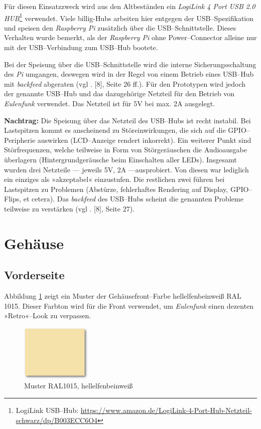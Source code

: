 \documentclass[11pt,ngerman,toc=listof,index=totoc]{scrreprt}
\begin{document}
Für diesen Einsatzzweck wird aus den Altbeständen ein \emph{LogiLink 4
Port USB 2.0 HUB}\footnote{LogiLink USB--Hub:
  \url{https://www.amazon.de/LogiLink-4-Port-Hub-Netzteil-schwarz/dp/B003ECC6O4}}
verwendet. Viele billig-Hubs arbeiten hier entgegen der
USB--Spezifikation und speisen den \emph{Raspberry Pi} zusätzlich über
die USB--Schnittstelle. Dieses Verhalten wurde bemerkt, als der
\emph{Raspberry Pi} ohne Power--Connector alleine nur mit der
USB--Verbindung zum USB--Hub bootete.

Bei der Speisung über die USB--Schnittstelle wird die interne
Sicherungsschaltung des \emph{Pi} umgangen, deswegen wird in der Regel
von einem Betrieb eines USB--Hub mit \emph{backfeed} abgeraten (vgl .
{[}8{]}, Seite 26 ff.). Für den Prototypen wird jedoch der genannte
USB--Hub und das dazugehörige Netzteil für den Betrieb von
\emph{Eulenfunk} verwendet. Das Netzteil ist für 5V bei max. 2A
ausgelegt.

\textbf{Nachtrag:} Die Speisung über das Netzteil des USB--Hubs ist
recht instabil. Bei Lastspitzen kommt es anscheinend zu
Störeinwirkungen, die sich auf die GPIO--Peripherie auswirken
(LCD--Anzeige rendert inkorrekt). Ein weiterer Punkt sind
Störfrequenzen, welche teilweise in Form von Störgeräuschen die
Audioausgabe überlagern (Hintergrundgeräusche beim Einschalten aller
LEDs). Insgesamt wurden drei Netzteile --- jeweils 5V, 2A
---ausprobiert. Von diesen war lediglich ein einziges als »akzeptabel«
einzustufen. Die restlichen zwei führen bei Lastspitzen zu Problemen
(Abstürze, fehlerhaftes Rendering auf Display, GPIO--Flips, et cetera).
Das \emph{backfeed} des USB--Hubs scheint die genannten Probleme
teilweise zu verstärken (vgl . {[}8{]}, Seite 27).

\section{Gehäuse}\label{gehuxe4use}

\subsection{Vorderseite}\label{vorderseite}

Abbildung \ref{ral} zeigt ein Muster der Gehäusefront--Farbe
hellelfenbeinweiß RAL 1015. Dieser Farbton wird für die Front verwendet,
um \emph{Eulenfunk} einen dezenten »Retro«--Look zu verpassen.

\begin{figure}[h!]
  \centering
  \includegraphics[width=0.3\textwidth]{images/ral_soft.png}
  \caption{Muster RAL1015, hellelfenbeinweiß}
  \label{ral}
\end{figure}
\end{document}
